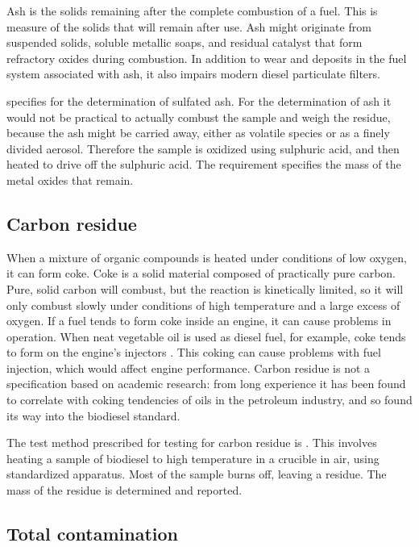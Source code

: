 Ash is the solids remaining after the complete combustion of a fuel. This is
measure of the solids that will remain after use. Ash might originate from
suspended solids, soluble metallic soaps, and residual catalyst that form
refractory oxides during combustion. In addition to wear and deposits in the
fuel system associated with ash, it also impairs modern diesel particulate
filters.

 specifies  for the determination of sulfated ash.
For the determination of ash it would not be practical to actually combust the
sample and weigh the residue, because the ash might be carried away, either as
volatile species or as a finely divided aerosol. Therefore the sample is
oxidized using sulphuric acid, and then heated to drive off the sulphuric acid.
The requirement specifies the mass of the metal oxides that remain.

\subsection{Carbon residue}

When a mixture of organic compounds is heated under conditions of low oxygen, it
can form coke. Coke is a solid material composed of practically pure carbon.
Pure, solid carbon will combust, but the reaction is kinetically limited, so it
will only combust slowly under conditions of high temperature and a large excess
of oxygen. If a fuel tends to form coke inside an engine, it can cause problems
in operation. When neat vegetable oil is used as diesel fuel, for example, coke
tends to form on the engine's injectors \autocite{vanderWalt1982}. This coking
can cause problems with fuel injection, which would affect engine performance.
Carbon residue is not a specification based on academic research: from long
experience it has been found to correlate with coking tendencies of oils in the
petroleum industry, and so found its way into the biodiesel standard.

The test method prescribed for testing for carbon residue is .
This involves heating a sample of biodiesel to high temperature in a crucible in
air, using standardized apparatus. Most of the sample burns off, leaving a
residue. The mass of the residue is determined and reported.

\subsection{Total contamination}

